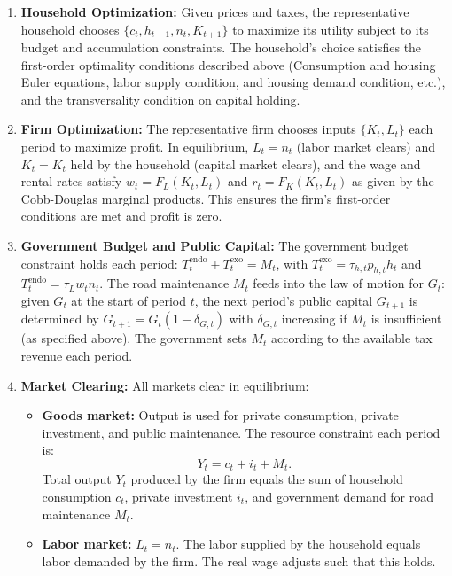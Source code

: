 \begin{enumerate}
    \item \textbf{Household Optimization:} Given prices and taxes, the representative household chooses $\{c_t, h_{t+1}, n_t, K_{t+1}\}$ to maximize its utility subject to its budget and accumulation constraints. The household’s choice satisfies the first-order optimality conditions described above (Consumption and housing Euler equations, labor supply condition, and housing demand condition, etc.), and the transversality condition on capital holding.

    \item \textbf{Firm Optimization:} The representative firm chooses inputs $\{K_t, L_t\}$ each period to maximize profit. In equilibrium, $L_t = n_t$ (labor market clears) and $K_t = K_t$ held by the household (capital market clears), and the wage and rental rates satisfy $w_t = F_L(K_t,L_t)$ and $r_t = F_K(K_t,L_t)$ as given by the Cobb-Douglas marginal products. This ensures the firm’s first-order conditions are met and profit is zero.

    \item \textbf{Government Budget and Public Capital:} The government budget constraint holds each period: $T^{\text{endo}}_t + T^{\text{exo}}_t = M_t$, with $T^{\text{exo}}_t = \tau_{h,t} p_{h,t} h_t$ and $T^{\text{endo}}_t = \tau_L w_t n_t$. The road maintenance $M_t$ feeds into the law of motion for $G_t$: given $G_t$ at the start of period $t$, the next period’s public capital $G_{t+1}$ is determined by $G_{t+1} = G_t(1 - \delta_{G,t})$ with $\delta_{G,t}$ increasing if $M_t$ is insufficient (as specified above). The government sets $M_t$ according to the available tax revenue each period.

    \item \textbf{Market Clearing:} All markets clear in equilibrium:
    \begin{itemize}
        \item \textbf{Goods market:} Output is used for private consumption, private investment, and public maintenance. The resource constraint each period is:
        \begin{equation}
        Y_t = c_t + i_t + M_t.
        \end{equation}
        Total output $Y_t$ produced by the firm equals the sum of household consumption $c_t$, private investment $i_t$, and government demand for road maintenance $M_t$.

        \item \textbf{Labor market:} $L_t = n_t$. The labor supplied by the household equals labor demanded by the firm. The real wage adjusts such that this holds.


\end{itemize}
\end{enumerate}
